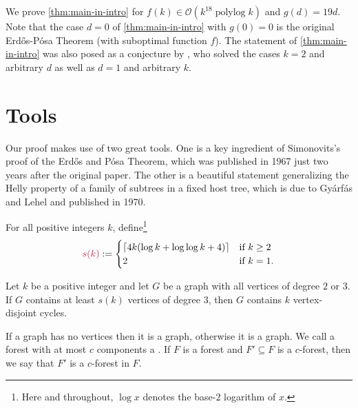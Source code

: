 \documentclass{patmorin}
\DeclareMathOperator{\polylog}{polylog}
\newcommand{\Oh}{\mathcal{O}}
\begin{document}
We prove \cref{thm:main-in-intro} for $f(k)\in\Oh(k^{18}\polylog k)$ and $g(d)=19d$. Note that the case $d=0$ of \cref{thm:main-in-intro} with $g(0)=0$ is the original Erd\H{o}s-Pósa Theorem (with suboptimal function $f$). The statement of \cref{thm:main-in-intro} was also posed as a conjecture by \citet{ahn.gollin:coarse}, who solved the cases $k=2$ and arbitrary $d$ as well as $d=1$ and arbitrary $k$.


\section{Tools}

Our proof makes use of two great tools. One is a key ingredient of Simonovits's~\cite{Simonovits67} proof of the Erdős and Pósa Theorem, which was published in 1967 just two years after the original paper. The other is a beautiful statement generalizing the Helly property of a family of subtrees in a fixed host tree, which is due to Gyárfás and Lehel and published in 1970.


For all positive integers $k$, define\footnote{Here and throughout, $\log x$ denotes the base-$2$ logarithm of $x$.}
\[
  \mathdefin{s(k)}:=
    \begin{cases}
      \lceil 4k(\log k + \log\log k +4)\rceil & \textrm{if $k\geq2$}\\
      2 & \textrm{if $k=1$.}
    \end{cases}
\]

\begin{thm}\label{thm:simonovits}
  Let $k$ be a positive integer and let $G$ be a graph with all vertices of degree $2$ or $3$. If $G$ contains at least $s(k)$ vertices of degree $3$, then $G$ contains $k$ vertex-disjoint cycles.
\end{thm}

If a graph has no vertices then it is a  graph, otherwise it is a  graph. We call a forest with at most $c$ components a . If $F$ is a forest and $F'\subseteq F$ is a $c$-forest, then we say that $F'$ is a $c$-forest  in $F$.
\end{document}

